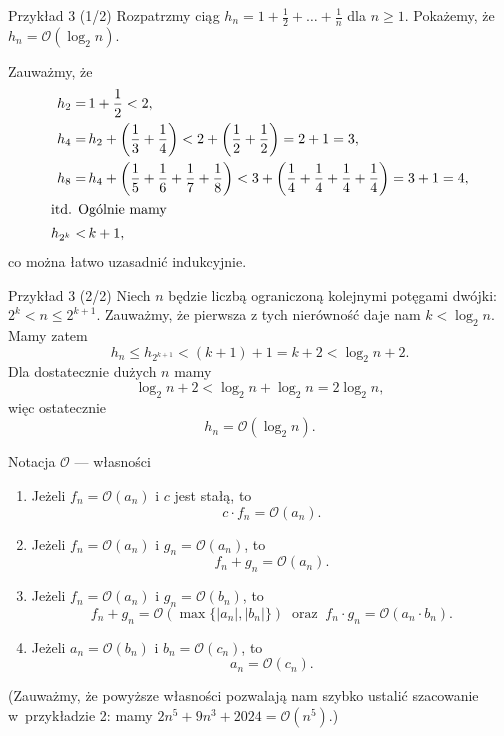 \documentclass[a4paper,10pt]{beamer}
\begin{document}
\begin{frame}
\begin{exampleblock}{Przykład 3 (1/2)}
Rozpatrzmy ciąg $h_n=1+\frac12+\ldots+\frac1n$ dla $n\geqslant1$. Pokażemy, że $h_n=\mathcal{O}(\log_2n)$.

\medskip

Zauważmy, że
\begin{align*}
h_2=&\,1+\frac12<2,\\
h_4=&\,h_2+\left(\frac13+\frac14\right)<2+\left(\frac12+\frac12\right)=2+1=3,\\
h_8=&\,h_4+\left(\frac15+\frac16+\frac17+\frac18\right)<3+\left(\frac14+\frac14+\frac14+\frac14\right)=3+1=4,\\
\intertext{itd. Ogólnie mamy}
h_{2^k}<&\,k+1,
\end{align*}
co można łatwo uzasadnić indukcyjnie.
\end{exampleblock}
\end{frame}


\begin{frame}
\begin{exampleblock}{Przykład 3 (2/2)}
 Niech $n$ będzie liczbą ograniczoną kolejnymi potęgami dwójki: $2^k<n\leqslant2^{k+1}$. Zauważmy, że pierwsza z tych nierówność daje nam $k<\log_2n$. Mamy zatem
 $$h_n\leqslant h_{2^{k+1}}<(k+1)+1=k+2<\log_2n+2.$$
 Dla dostatecznie dużych $n$ mamy $$\log_2n+2<\log_2n+\log_2n=2\log_2n,$$ więc ostatecznie $$h_n=\mathcal{O}(\log_2n).$$
\end{exampleblock}
\end{frame}


\begin{frame}
\begin{block}{Notacja $\mathcal{O}$ --- własności}
\begin{enumerate}
\item Jeżeli $f_n=\mathcal{O}(a_n)$ i $c$ jest stałą, to $$c\cdot f_n=\mathcal{O}(a_n).$$
\item Jeżeli $f_n=\mathcal{O}(a_n)$ i $g_n=\mathcal{O}(a_n)$, to $$f_n+g_n=\mathcal{O}(a_n).$$
\item Jeżeli $f_n=\mathcal{O}(a_n)$ i $g_n=\mathcal{O}(b_n)$, to
$$f_n+g_n=\mathcal{O}(\max\{|a_n|,|b_n|\})\ \mbox{ oraz }\ f_n\cdot g_n=\mathcal{O}(a_n\cdot b_n).$$
\item Jeżeli $a_n=\mathcal{O}(b_n)$ i $b_n=\mathcal{O}(c_n)$, to $$a_n=\mathcal{O}(c_n).$$
\end{enumerate}
\end{block}

\bigskip

(Zauważmy, że powyższe własności pozwalają nam szybko ustalić szacowanie w~przykładzie 2: mamy $2n^5+9n^3+2024=\mathcal{O}(n^5).$)
\end{frame}
\end{document}
